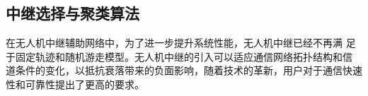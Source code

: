 \subsection{中继选择与聚类算法}\label{section1-2-3}
\begin{comment}
\begin{verbatim}
% !Mode:: "TeX:UTF-8"
\chapter{绪论}
我是绪论中的正文文本。

\section{课题背景}
我要使用引用命令为我的文章引用文献：
\ldots加速度为\SI{12345}{\square\micro\meter\per\nano\second}，是一般加速度的\num{1.2345e3}倍\supercite{Yablonovitch1987}，
误差\SI{+-2e-6}{\square\micro\meter\per\nano\second}。

\subsection{该小节插图}
这里我要使用图形环境插图。注意该插图拥有中英双语图注和自动生成的图形编号。同时我要引用该图形：该图的编号是\ref{fig-pcf}。
\begin{figure}[hptb]
 \centering
 \texttt{[image: chp-1\_pcf]}
 \caption{形式多样的光子晶体光纤} \label{fig-pcf}
\end{figure}

\subsection{该小节插入公式}
我还要使用公式环境插入公式。注意公式是自动居中编号。同时我也要引用该公式，该公式的编号是\eqref{equ-sample}
\begin{equation}\label{equ-sample}
\sum_{i=1}^n\sin\beta_i^2+\int_a^b\frac{D}{c}\,\mathrm{d}x=0.
\end{equation}

\section{本章小结}
以上为本章的所有内容。
\end{verbatim}
保存该文件。切换到template.tex主文件，依次执行菜单``TeX"下的``XeLaTeX" - ``BibTeX" - ``XeLaTeX" - ``XeLaTeX"，（这些步骤也可以通过工具栏上的
按钮完成）。之后会在主目录下自动生成PDF文件，您不妨亲自动手试试看！
生成的参考文献如图\ref{fig-ctt}所示。
\begin{figure}[hptb]
 \centering
 \texttt{[image: citation]}
\Figcaption{自动生成的参考文献}\label{fig-ctt}
\end{figure}
\end{comment}
\textcolor[RGB]{202,12,22}{在无人机中继辅助网络中，为了进一步提升系统性能，无人机中继已经不再满
足于固定轨迹和随机游走模型。无人机中继的引入可以适应通信网络拓扑结构和信
道条件的变化，以抵抗衰落带来的负面影响，随着技术的革新，用户对于通信快速
性和可靠性提出了更高的要求。}

